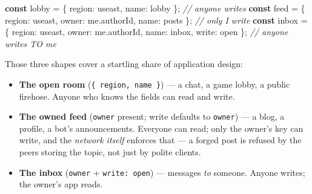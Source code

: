 \documentclass[
  nobib]{tufte-handout}
\newenvironment{Shaded}{}{}
\newcommand{\AttributeTok}[1]{\textcolor[rgb]{0.49,0.56,0.16}{#1}}
\newcommand{\CommentTok}[1]{\textcolor[rgb]{0.38,0.63,0.69}{\textit{#1}}}
\newcommand{\DataTypeTok}[1]{\textcolor[rgb]{0.56,0.13,0.00}{#1}}
\newcommand{\KeywordTok}[1]{\textcolor[rgb]{0.00,0.44,0.13}{\textbf{#1}}}
\newcommand{\NormalTok}[1]{#1}
\newcommand{\OperatorTok}[1]{\textcolor[rgb]{0.40,0.40,0.40}{#1}}
\newcommand{\StringTok}[1]{\textcolor[rgb]{0.25,0.44,0.63}{#1}}
\providecommand{\tightlist}{%
  \setlength{\itemsep}{0pt}\setlength{\parskip}{0pt}}
\begin{document}
\begin{Shaded}
\begin{Highlighting}[]
\KeywordTok{const}\NormalTok{ lobby }\OperatorTok{=}\NormalTok{ \{ }\DataTypeTok{region}\OperatorTok{:} \StringTok{\textquotesingle{}useast\textquotesingle{}}\OperatorTok{,} \DataTypeTok{name}\OperatorTok{:} \StringTok{\textquotesingle{}lobby\textquotesingle{}}\NormalTok{ \}}\OperatorTok{;}                        \CommentTok{// anyone writes}
\KeywordTok{const}\NormalTok{ feed  }\OperatorTok{=}\NormalTok{ \{ }\DataTypeTok{region}\OperatorTok{:} \StringTok{\textquotesingle{}useast\textquotesingle{}}\OperatorTok{,} \DataTypeTok{owner}\OperatorTok{:}\NormalTok{ me}\OperatorTok{.}\AttributeTok{authorId}\OperatorTok{,} \DataTypeTok{name}\OperatorTok{:} \StringTok{\textquotesingle{}posts\textquotesingle{}}\NormalTok{ \}}\OperatorTok{;}   \CommentTok{// only I write}
\KeywordTok{const}\NormalTok{ inbox }\OperatorTok{=}\NormalTok{ \{ }\DataTypeTok{region}\OperatorTok{:} \StringTok{\textquotesingle{}useast\textquotesingle{}}\OperatorTok{,} \DataTypeTok{owner}\OperatorTok{:}\NormalTok{ me}\OperatorTok{.}\AttributeTok{authorId}\OperatorTok{,} \DataTypeTok{name}\OperatorTok{:} \StringTok{\textquotesingle{}inbox\textquotesingle{}}\OperatorTok{,} \DataTypeTok{write}\OperatorTok{:} \StringTok{\textquotesingle{}open\textquotesingle{}}\NormalTok{ \}}\OperatorTok{;} \CommentTok{// anyone writes TO me}
\end{Highlighting}
\end{Shaded}

Those three shapes cover a startling share of application design:

\begin{itemize}
\tightlist
\item
  \textbf{The open room} (\texttt{\{\ region,\ name\ \}}) --- a chat, a
  game lobby, a public firehose. Anyone who knows the fields can read
  and write.
\item
  \textbf{The owned feed} (\texttt{owner} present; write defaults to
  \texttt{\textquotesingle{}owner\textquotesingle{}}) --- a blog, a
  profile, a bot's announcements. Everyone can read; only the owner's
  key can write, and the \emph{network itself} enforces that --- a
  forged post is refused by the peers storing the topic, not just by
  polite clients.
\item
  \textbf{The inbox} (\texttt{owner} +
  \texttt{write:\ \textquotesingle{}open\textquotesingle{}}) ---
  messages \emph{to} someone. Anyone writes; the owner's app reads.
\end{itemize}
\end{document}
